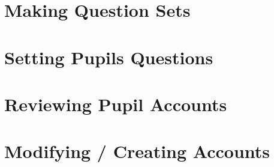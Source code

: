 \documentclass{report}
\begin{document}
\section{Making Question Sets}
\section{Setting Pupils Questions}
\section{Reviewing Pupil Accounts}
\section{Modifying  / Creating Accounts}
\end{document}

